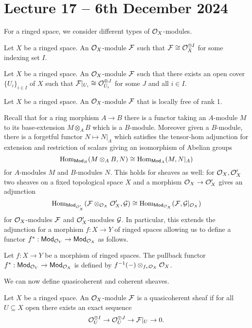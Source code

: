 \section{Lecture 17 -- 6th December 2024}\label{sec: lecture 17}
For a ringed space, we consider different types of $\mathcal{O}_{X}$-modules. 
\begin{definition}
    Let $X$ be a ringed space. An $\mathcal{O}_{X}$-module $\mathcal{F}$ such that $\mathcal{F}\cong\mathcal{O}_{X}^{\oplus I}$ for some indexing set $I$. 
\end{definition}
\begin{definition}
    Let $X$ be a ringed space. An $\mathcal{O}_{X}$-module $\mathcal{F}$ such that there exists an open cover $\{U_{i}\}_{i\in I}$ of $X$ such that $\mathcal{F}|_{U_{i}}\cong\mathcal{O}_{U_{i}}^{\oplus J}$ for some $J$ and all $i\in I$. 
\end{definition}
\begin{definition}
    Let $X$ be a ringed space. An $\mathcal{O}_{X}$-module $\mathcal{F}$ that is locally free of rank 1. 
\end{definition}
Recall that for a ring morphism $A\to B$ there is a functor taking an $A$-module $M$ to its base-extension $M\otimes_{A}B$ which is a $B$-module. Moreover given a $B$-module, there is a forgetful functor $N\mapsto N|_{A}$ which satisfies the tensor-hom adjunction for extension and restriction of scalars giving an isomorphism of Abelian groups
$$\mathrm{Hom}_{\mathsf{Mod}_{B}}(M\otimes_{A}B,N)\cong\mathrm{Hom}_{\mathsf{Mod}_{A}}(M,N|_{A})$$
for $A$-modules $M$ and $B$-modules $N$. This holds for sheaves as well: for $\mathcal{O}_{X},\mathcal{O}_{X}'$ two sheaves on a fixed topological space $X$ and a morphism $\mathcal{O}_{X}\to\mathcal{O}_{X}'$ gives an adjunction
$$\mathrm{Hom}_{\mathsf{Mod}_{\mathcal{O}_{X}'}}(\mathcal{F}\otimes_{\mathcal{O}_{X}}\mathcal{O}_{X}',\mathcal{G})\cong\mathrm{Hom}_{\mathsf{Mod}_{\mathcal{O}_{X}}}(\mathcal{F},\mathcal{G}|_{\mathcal{O}_{X}})$$
for $\mathcal{O}_{X}$-modules $\mathcal{F}$ and $\mathcal{O}_{X}'$-modules $\mathcal{G}$. In particular, this extends the adjunction for a morphism $f:X\to Y$ of ringed spaces allowing us to define a functor $f^{*}:\mathsf{Mod}_{\mathcal{O}_{Y}}\to\mathsf{Mod}_{\mathcal{O}_{X}}$ as follows. 
\begin{definition}\label{def: pullback}
    Let $f:X\to Y$ be a morphism of ringed spaces. The pullback functor $f^{*}:\mathsf{Mod}_{\mathcal{O}_{Y}}\to\mathsf{Mod}_{\mathcal{O}_{X}}$ is defined by $f^{-1}(-)\otimes_{f_{*}\mathcal{O}_{X}}\mathcal{O}_{X}$.
\end{definition}
We can now define quasicoherent and coherent sheaves. 
\begin{definition}\label{def: quasicoherent sheaf}
    Let $X$ be a ringed space. An $\mathcal{O}_{X}$-module $\mathcal{F}$ is a quasicoherent sheaf if for all $U\subseteq X$ open there exists an exact sequence 
    $$\mathcal{O}_{U}^{\oplus I}\to\mathcal{O}_{U}^{\oplus J}\to\mathcal{F}|_{U}\to0.$$
\end{definition}
